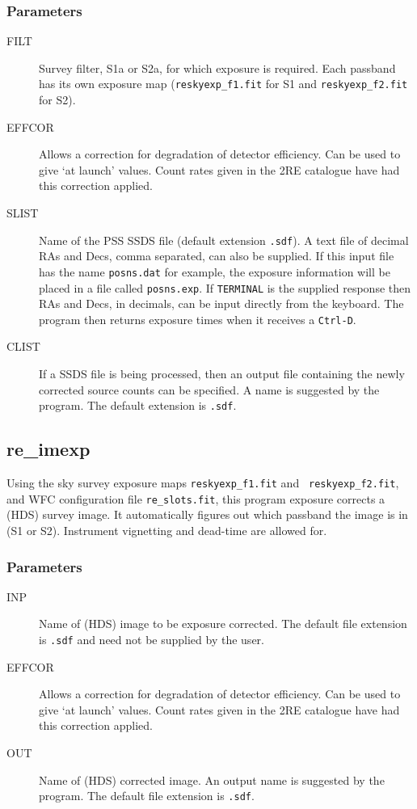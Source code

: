 \subsubsection{Parameters}

\begin{description}

\item[FILT  ] 
Survey filter, S1a or S2a, for which exposure is required.  Each passband has 
its own exposure map ({\tt reskyexp\_f1.fit} for S1 and {\tt reskyexp\_f2.fit}
for S2).
\item[EFFCOR  ]
 Allows a correction for degradation of detector efficiency.  Can be used
to give `at launch' values.  Count rates given in the 2RE catalogue have
had this correction applied.
\item[SLIST  ]    
Name of the PSS SSDS file (default extension {\tt .sdf}).  A text file of 
decimal RAs and Decs, comma   separated, can also be supplied.  If this input 
file has the name {\tt posns.dat} for example, the exposure information will 
be placed  in a file called {\tt posns.exp}.  If {\tt TERMINAL} is the supplied
response then RAs and Decs, in decimals, can be input directly from the 
keyboard. The program then returns exposure times when it receives 
a {\tt Ctrl-D}.
\item[CLIST   ]
 If a SSDS file is being processed, then an output file containing the
 newly corrected source counts can be specified.  A name is suggested by
the program.  The default extension is {\tt .sdf}.
\end{description}

\subsection{\label{ss_re_imexp}re\_imexp}	

Using the sky survey exposure maps {\tt reskyexp\_f1.fit} and {\tt
reskyexp\_f2.fit}, and WFC configuration file {\tt re\_slots.fit},
this program exposure corrects a (HDS) survey image.  It automatically
figures out which passband the image is in (S1 or S2).  Instrument
vignetting and dead-time are allowed for.

\subsubsection{Parameters}

\begin{description}
\item[INP   ]
Name of (HDS) image to be exposure corrected.  The default file extension
is {\tt .sdf} and need not be supplied by the user.
\item[EFFCOR  ]
Allows a correction for degradation of detector efficiency.  Can be used
to give `at launch' values.  Count rates given in the 2RE catalogue have
had this correction applied.
\item[OUT   ]
Name of (HDS) corrected image.  An output name is suggested by the
program. The default file extension is {\tt .sdf}.
\end{description}

